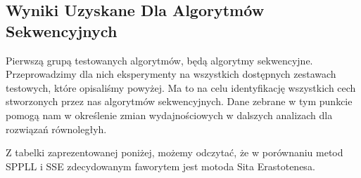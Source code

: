 \documentclass{article}
\begin{document}
        \subsection{Wyniki Uzyskane Dla Algorytmów Sekwencyjnych}
            Pierwszą grupą testowanych algorytmów, będą algorytmy sekwencyjne. Przeprowadzimy dla nich eksperymenty na wszystkich dostępnych zestawach testowych, które opisaliśmy powyżej. Ma to na celu identyfikację wszystkich cech stworzonych przez nas algorytmów sekwencyjnych. Dane zebrane w tym punkcie pomogą nam w określenie zmian wydajnościowych w dalszych analizach dla rozwiązań równoległyh.
            
            Z tabelki zaprezentowanej poniżej, możemy odczytać, że w porównaniu metod \gls{SPPLL} i \gls{SSE} zdecydowanym faworytem jest motoda Sita Erastotenesa. 
            
\end{document}
